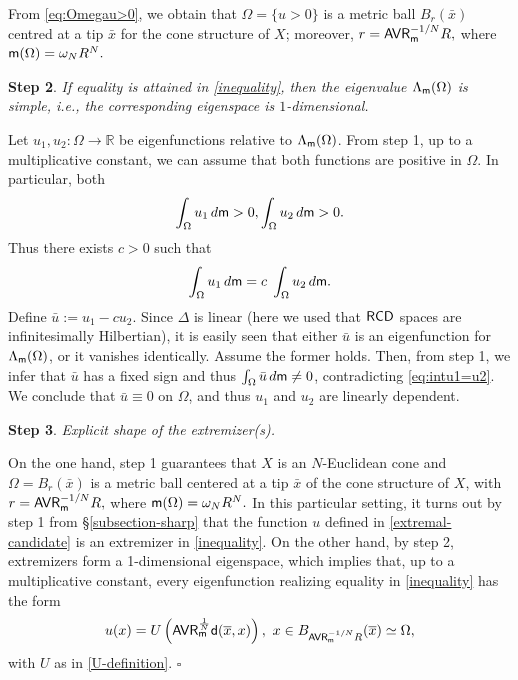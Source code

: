 \documentclass[11pt, reqno]{amsart}
\numberwithin{equation}{section}
\begin{document}
From \eqref{eq:Omegau>0}, we obtain that $\Omega=\{u>0\}$ is a metric ball $B_r(\bar x)$ centred at a tip $\bar{x}$ for the cone structure of $X$; moreover, $r={\sf AVR}_ {\sf m}^{-{1}/{N}}R,$ where ${\sf m}(\Omega)=\omega_NR^N.$ 
\smallskip

\textbf{Step 2}.  \textit{If equality is attained in \eqref{inequality}, then the eigenvalue $\Lambda_ {\sf m}(\Omega)$ is simple, i.e., the corresponding eigenspace is $1$-dimensional.}


Let $u_1, u_2: \Omega\to \mathbb{R}$ be eigenfunctions relative to  $\Lambda_{\sf m}(\Omega)$. From step 1, up to a multiplicative constant, we can assume that both functions are positive in $\Omega$. In particular, both $$\int_\Omega u_1\, {\rm d}{\sf m}>0,  \int_\Omega u_2\, {\rm d}{\sf m}>0.$$ Thus there exists $c>0$ such that 
\begin{equation}\label{eq:intu1=u2}
\int_\Omega u_1\, {\rm d}{\sf m}= c\; \int_\Omega u_2\, {\rm d}{\sf m}.
\end{equation}
Define $\bar{u}:= u_1 - c u_2$. Since $\Delta$ is linear (here we used that ${\sf RCD}$ spaces are infinitesimally Hilbertian), it is easily seen that either $\bar{u}$ is an eigenfunction for $\Lambda_{\sf m}(\Omega)$, or it vanishes identically. Assume the former holds. Then, from step 1, we infer that $\bar u$ has a fixed sign and thus $\int_{\Omega} \bar u \, {\rm d}{\sf m}\neq 0$, contradicting  \eqref{eq:intu1=u2}.
We conclude that $\bar u \equiv 0$ on $\Omega$, and thus $u_1$ and $u_2$ are linearly dependent. 
\smallskip


		\textbf{Step 3}. {\it Explicit shape of the extremizer(s).}
  
  On the one hand, step 1 guarantees that $X$ is an $N$-Euclidean cone and $\Omega=B_r(\bar x)$ is a metric ball centered at a tip $\bar{x}$ of the cone structure of $X$, with $r={\sf AVR}_ {\sf m}^{-{1}/{N}}R,$ where ${\sf m}(\Omega)=\omega_NR^N.$ In this particular setting, it turns out by step 1 from \S\ref{subsection-sharp}  that the function $u$ defined in \eqref{extremal-candidate}   is an extremizer in \eqref{inequality}. On the other hand, by step 2, extremizers form a 1-dimensional eigenspace, which implies that, up to a multiplicative constant, every eigenfunction realizing equality in \eqref{inequality} has the form $$u(x)=U\left({\sf AVR}_ {\sf m}^{\frac{1}{N}}{\sf d}(\overline x,x)\right),\   x\in B_{{\sf AVR}_ {\sf m}^{-{1}/{N}}R}(\overline x)\simeq \Omega, $$ with $U$ as in  \eqref{U-definition}.   
	 \hfill $\square$ 
\end{document}
